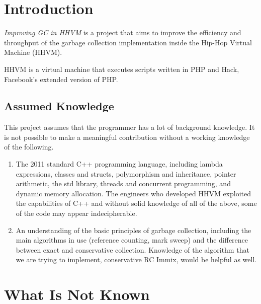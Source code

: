 

\chapter{Introduction}
\emph{Improving GC in HHVM} is a project that aims to improve the efficiency and throughput of the garbage collection implementation inside the Hip-Hop Virtual Machine (HHVM).

HHVM is a virtual machine that executes scripts written in PHP and Hack, Facebook's extended version of PHP.

\section{Assumed Knowledge}
This project assumes that the programmer has a lot of background knowledge. It is not possible to make a meaningful contribution without a working knowledge of the following.
\begin{enumerate}
  \item The 2011 standard C++ programming language, including lambda expressions, classes and structs, polymorphism and inheritance, pointer arithmetic, the std library, threads and concurrent programming, and dynamic memory allocation. The engineers who developed HHVM exploited the capabilities of C++ and without solid knowledge of all of the above, some of the code may appear indecipherable.
  \item An understanding of the basic principles of garbage collection, including the main algorithms in use (reference counting, mark sweep) and the difference between exact and conservative collection. Knowledge of the algorithm that we are trying to implement, conservative RC Immix, would be helpful as well.
\end{enumerate}
\chapter{What Is Not Known}
